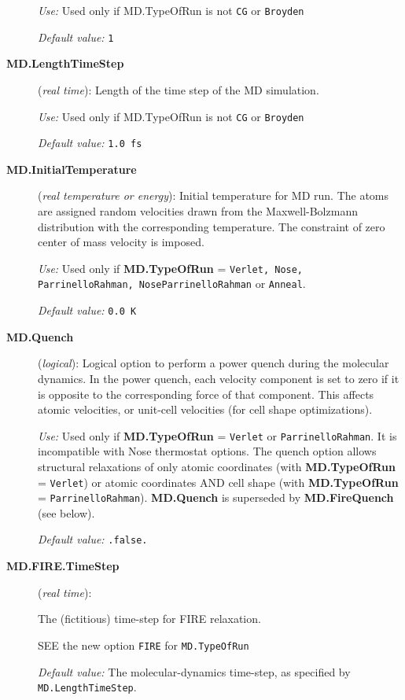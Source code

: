 \documentclass[11pt]{article}
\begin{document}
\begin{description}
{\it Use:} Used only if MD.TypeOfRun is not {\tt CG} or {\tt Broyden}
    
{\it Default value:} {\tt 1}

\item[{\bf MD.LengthTimeStep}] ({\it real time}): 
Length of the time step of the MD simulation.

{\it Use:} Used only if MD.TypeOfRun is not {\tt CG} or {\tt Broyden}
    
{\it Default value:} {\tt 1.0 fs}

\item[{\bf MD.InitialTemperature}] ({\it real temperature or energy}): 
Initial temperature for MD run. The atoms are assigned random 
velocities drawn from the Maxwell-Bolzmann distribution with the
corresponding temperature. The constraint of zero center of
mass velocity is imposed.

{\it Use:} Used only if {\bf MD.TypeOfRun} = {\tt Verlet, Nose, 
ParrinelloRahman, NoseParrinelloRahman}
or {\tt Anneal}.

{\it Default value:} {\tt 0.0 K}

\item[{\bf MD.Quench}] ({\it logical}): 
Logical option to perform a power quench during the molecular dynamics. 
In the power quench, each velocity component is set to
zero if it is opposite to the corresponding force
of that component. This affects atomic velocities,
or unit-cell velocities (for cell shape optimizations).

{\it Use:} Used only if {\bf MD.TypeOfRun} = {\tt Verlet} or 
{\tt ParrinelloRahman}.
It is incompatible with Nose thermostat options.
The quench option allows structural relaxations of
only atomic coordinates (with {\bf MD.TypeOfRun} = {\tt Verlet})
or atomic coordinates AND cell shape 
(with {\bf MD.TypeOfRun} = {\tt ParrinelloRahman}).
{\bf MD.Quench} is superseded by {\bf MD.FireQuench} (see below).

{\it Default value:} {\tt .false.}

\item[{\bf MD.FIRE.TimeStep}] ({\it real time}): 

The (fictitious) time-step for FIRE relaxation. 

SEE the new option {\tt FIRE} for {\tt MD.TypeOfRun}

{\it Default value:} The molecular-dynamics time-step, as
specified by {\tt MD.LengthTimeStep}.


\end{description}
\end{document}

